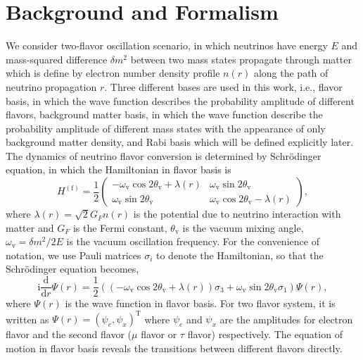 \documentclass[%
reprint,
 amsmath,amssymb,
 aps,
]{revtex4-1}
\begin{document}

\section{\label{sec:background}Background and Formalism}


We consider two-flavor oscillation scenario, in which neutrinos have energy $E$ and mass-squared difference $\delta m^2$ between two mass states propagate through matter which is define by electron number density profile $n(r)$ along the path of neutrino propagation $r$. Three different bases are used in this work, i.e., flavor basis, in which the wave function describes the probability amplitude of different flavors, background matter basis, in which the wave function describe the probability amplitude of different mass states with the appearance of only background matter density, and Rabi basis which will be defined explicitly later. The dynamics of neutrino flavor conversion is determined by Schr\"{o}dinger equation, in which the Hamiltonian in flavor basis is
\begin{equation}
    H^{(\mathrm{f})} =  \frac{1}{2} \begin{pmatrix}
    -\omega_{\mathrm{v}} \cos 2\theta_{\mathrm{v}} + \lambda(r) & \omega_{\mathrm{v}}\sin 2\theta_{\mathrm{v}} \\
   \omega_{\mathrm{v}} \sin 2\theta_{\mathrm{v}} & \omega_{\mathrm{v}} \cos 2\theta_{\mathrm{v}} - \lambda(r)
    \end{pmatrix},
\end{equation}
where $\lambda(r)= \sqrt{2}G_F n(r)$ is the potential due to neutrino interaction with matter and $G_F$ is the Fermi constant, $\theta_{\mathrm{v}}$ is the vacuum mixing angle, $\omega_{\mathrm{v}} = \delta m^2/2E$ is the vacuum oscillation frequency. For the convenience of notation, we use Pauli matrices $\sigma_i$ to denote the Hamiltonian, so that the Schr\"{o}dinger equation becomes,
\begin{equation}
    \mathrm i\frac{\mathrm d}{\mathrm d r}\Psi(r) = \frac{1}{2} \left(  
    (- \omega_{\mathrm{v}}\cos 2\theta_{\mathrm{v}} + \lambda(r) ) \sigma_3 + \omega_{\mathrm{v}}\sin 2\theta_{\mathrm{v}} \sigma_1 
    \right)
    \Psi(r),
\end{equation}
where $\Psi(r)$ is the wave function in flavor basis. For two flavor system, it is written as $ \Psi(r) = \left(
    \psi_{e} ,
    \psi_{x}
    \right)^{\mathrm{T}}$ 
where $\psi_{e}$ and $\psi_{x}$ are the amplitudes for electron flavor and the second flavor ($\mu$ flavor or $\tau$ flavor) respectively. The equation of motion in flavor basis reveals the transitions between different flavors directly.
\end{document}
